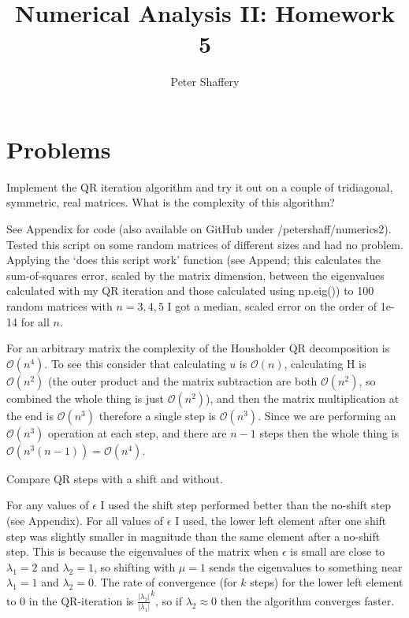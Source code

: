 \documentclass[10pt,a4paper]{article}
\newenvironment{problem}[2][Problem]{\begin{trivlist}
\item[\hskip \labelsep {\bfseries #1}\hskip \labelsep {\bfseries #2.}]}{\end{trivlist}}
\begin{document}
\author{Peter Shaffery}
\title{Numerical Analysis II: Homework 5}
\maketitle
\section{Problems}
\begin{problem}{1}
Implement the QR iteration algorithm and try it out on a couple of tridiagonal, symmetric, real matrices.  What is the complexity of this algorithm?
\end{problem}
See Appendix for code (also available on GitHub under /petershaff/numerics2).  Tested this script on some random matrices of different sizes and had no problem.  Applying the `does this script work' function (see Append; this calculates the sum-of-squares error, scaled by the matrix dimension, between the eigenvalues calculated with my QR iteration and those calculated using np.eig()) to 100 random matrices with $n=3,4,5$ I got a median, scaled error on the order of 1e-14 for all $n$.

For an arbitrary matrix the complexity of the Housholder QR decomposition is $\mathcal{O}(n^4)$.  To see this consider that calculating $u$ is $\mathcal{O}(n)$, calculating H is $\mathcal{O}(n^2)$ (the outer product and the matrix subtraction are both $\mathcal{O}(n^2)$, so combined the whole thing is just $\mathcal{O}(n^2)$), and then the matrix multiplication at the end is $\mathcal{O}(n^3)$ therefore a single step is $\mathcal{O}(n^3)$.  Since we are performing an $\mathcal{O}(n^3)$ operation at each step, and there are $n-1$ steps then the whole thing is $\mathcal{O}(n^3(n-1)) = \mathcal{O}(n^4)$.

\begin{problem}{2}
Compare QR steps with a shift and without.
\end{problem}
For any values of $\epsilon$ I used the shift step performed better than the no-shift step (see Appendix).  For all values of $\epsilon$ I used, the lower left element after one shift step was slightly smaller in magnitude than the same element after a no-shift step.  This is because the eigenvalues of the matrix when $\epsilon$ is small are close to$\lambda_1= 2$ and $\lambda_2=1$, so shifting with $\mu =1$ sends the eigenvalues to something near $\lambda_1 = 1$ and $\lambda_2 = 0$.  The rate of convergence (for $k$ steps) for the lower left element to 0 in the QR-iteration is $\frac{|\lambda_2|}{|\lambda_1|}^k$, so if $\lambda_2 \approx 0$ then the algorithm converges faster.
\end{document}
